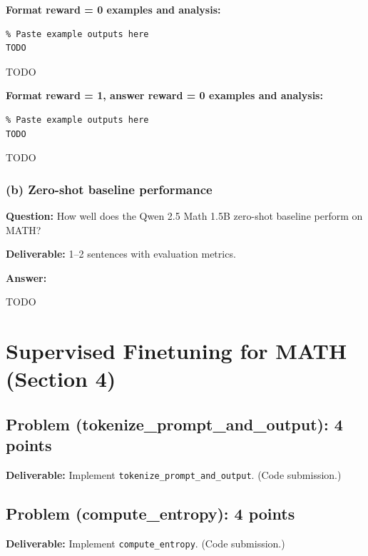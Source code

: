 \documentclass[11pt]{article}
\begin{document}
\textbf{Format reward = 0 examples and analysis:}

\begin{lstlisting}
% Paste example outputs here
TODO
\end{lstlisting}

TODO

\textbf{Format reward = 1, answer reward = 0 examples and analysis:}

\begin{lstlisting}
% Paste example outputs here
TODO
\end{lstlisting}

TODO

\subsubsection*{(b) Zero-shot baseline performance}

\textbf{Question:} How well does the Qwen 2.5 Math 1.5B zero-shot baseline perform on MATH?

\textbf{Deliverable:} 1--2 sentences with evaluation metrics.

\textbf{Answer:}

TODO


\section{Supervised Finetuning for MATH (Section 4)}

\subsection*{Problem (tokenize\_prompt\_and\_output): 4 points}

\textbf{Deliverable:} Implement \texttt{tokenize\_prompt\_and\_output}. (Code submission.)

\subsection*{Problem (compute\_entropy): 4 points}

\textbf{Deliverable:} Implement \texttt{compute\_entropy}. (Code submission.)
\end{document}
